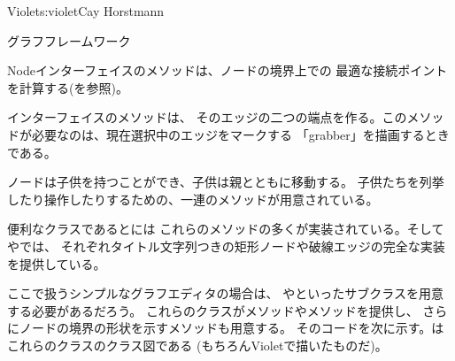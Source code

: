 \begin{aosachapter}{Violet}{s:violet}{Cay Horstmann}
\begin{aosasect1}{グラフフレームワーク}
\begin{aosaitemize}
\item Nodeインターフェイスのメソッドは、ノードの境界上での
  最適な接続ポイントを計算する(を参照)。

\item {}インターフェイスのメソッドは、
  そのエッジの二つの端点を作る。このメソッドが必要なのは、現在選択中のエッジをマークする
  「grabber」を描画するときである。

\item ノードは子供を持つことができ、子供は親とともに移動する。
  子供たちを列挙したり操作したりするための、一連のメソッドが用意されている。

\end{aosaitemize}


便利なクラスであるとには
これらのメソッドの多くが実装されている。そして
やでは、
それぞれタイトル文字列つきの矩形ノードや破線エッジの完全な実装を提供している。

ここで扱うシンプルなグラフエディタの場合は、
やといったサブクラスを用意する必要があるだろう。
これらのクラスがメソッドやメソッドを提供し、
さらにノードの境界の形状を示すメソッドも用意する。
そのコードを次に示す。はこれらのクラスのクラス図である
(もちろんVioletで描いたものだ)。


\end{aosasect1}
\end{aosachapter}
